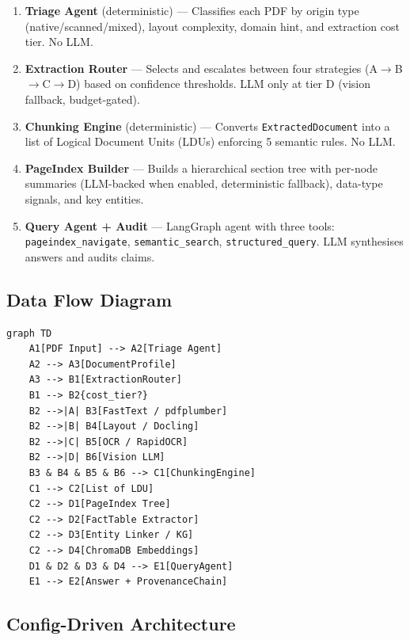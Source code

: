 \documentclass[12pt,a4paper]{article}
\begin{document}
\begin{enumerate}[nosep]
    \item \textbf{Triage Agent} (deterministic) — Classifies each PDF by
          origin type (native/scanned/mixed), layout complexity, domain hint,
          and extraction cost tier.  No LLM.
    \item \textbf{Extraction Router} — Selects and escalates between four
          strategies (A$\to$B$\to$C$\to$D) based on confidence thresholds.
          LLM only at tier D (vision fallback, budget-gated).
    \item \textbf{Chunking Engine} (deterministic) — Converts
          \texttt{ExtractedDocument} into a list of Logical Document Units
          (LDUs) enforcing 5 semantic rules.  No LLM.
    \item \textbf{PageIndex Builder} — Builds a hierarchical section tree
          with per-node summaries (LLM-backed when enabled, deterministic
          fallback), data-type signals, and key entities.
    \item \textbf{Query Agent + Audit} — LangGraph agent with three tools:
          \texttt{pageindex\_navigate}, \texttt{semantic\_search},
          \texttt{structured\_query}.  LLM synthesises answers and audits
          claims.
\end{enumerate}

\subsection{Data Flow Diagram}

\begin{lstlisting}[language={},caption={Pipeline Data Flow (Mermaid notation)}]
graph TD
    A1[PDF Input] --> A2[Triage Agent]
    A2 --> A3[DocumentProfile]
    A3 --> B1[ExtractionRouter]
    B1 --> B2{cost_tier?}
    B2 -->|A| B3[FastText / pdfplumber]
    B2 -->|B| B4[Layout / Docling]
    B2 -->|C| B5[OCR / RapidOCR]
    B2 -->|D| B6[Vision LLM]
    B3 & B4 & B5 & B6 --> C1[ChunkingEngine]
    C1 --> C2[List of LDU]
    C2 --> D1[PageIndex Tree]
    C2 --> D2[FactTable Extractor]
    C2 --> D3[Entity Linker / KG]
    C2 --> D4[ChromaDB Embeddings]
    D1 & D2 & D3 & D4 --> E1[QueryAgent]
    E1 --> E2[Answer + ProvenanceChain]
\end{lstlisting}

\subsection{Config-Driven Architecture}
\end{document}

